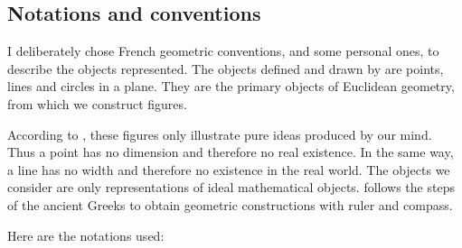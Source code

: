 \begin{minipage}{0.5\textwidth}
\end{minipage}
\begin{minipage}{0.5\textwidth}
  \begin{tkzexample}
  \end{tkzexample}
\end{minipage}

\subsection{Notations and conventions}

I deliberately chose French geometric conventions, and some personal ones, to describe the objects represented. The objects defined and drawn by \tkzname{\tkznameofpack} are points, lines and circles in a plane. They are the primary objects of Euclidean geometry, from which we construct figures.

According to , these figures only illustrate pure ideas produced by our mind.
Thus a point has no dimension and therefore no real existence. In the same way, a line has no width and therefore no existence in the real world. The objects we consider are only representations of ideal mathematical objects. \tkzname{\tkznameofpack} follows the steps of the ancient Greeks to obtain geometric constructions with ruler and compass.

Here are the notations used:

